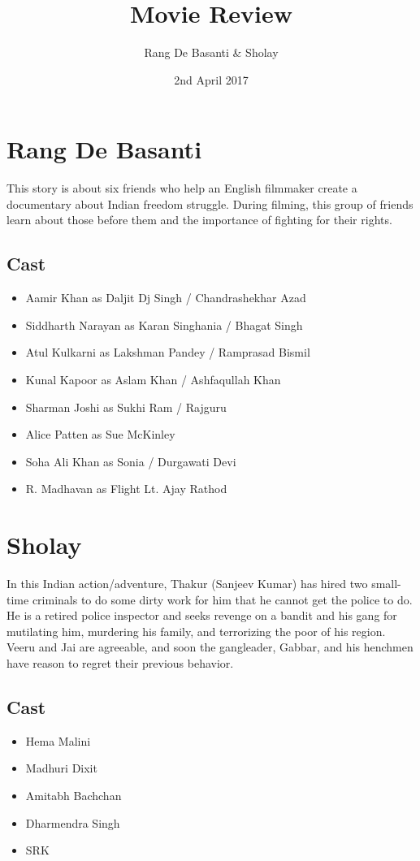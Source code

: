 \documentclass{article}
\title{Movie Review}
\author{Rang De Basanti \& Sholay }
\date{2nd April 2017}
\begin{document}
\maketitle

\section{Rang De Basanti}
This story is about six friends who help an English filmmaker create a documentary about Indian freedom struggle. During filming, this group of friends learn about those before them and the importance of fighting for their rights.
\subsection{Cast}

\begin{itemize}
    \item Aamir Khan as Daljit Dj Singh / Chandrashekhar Azad
    \item Siddharth Narayan as Karan Singhania / Bhagat Singh
    \item Atul Kulkarni as Lakshman Pandey / Ramprasad Bismil
    \item Kunal Kapoor as Aslam Khan / Ashfaqullah Khan
    \item Sharman Joshi as Sukhi Ram / Rajguru
    \item Alice Patten as Sue McKinley
    \item Soha Ali Khan as Sonia / Durgawati Devi
    \item R. Madhavan as Flight Lt. Ajay Rathod
\end{itemize}

\section{Sholay}
In this Indian action/adventure, Thakur (Sanjeev Kumar) has hired two small-time criminals to do some dirty work for him that he cannot get the police to do. He is a retired police inspector and seeks revenge on a bandit and his gang for mutilating him, murdering his family, and terrorizing the poor of his region. Veeru and Jai are agreeable, and soon the gangleader, Gabbar, and his henchmen have reason to regret their previous behavior.
\subsection{Cast}
\begin{itemize}
\item Hema Malini
\item Madhuri Dixit
\item Amitabh Bachchan
\item Dharmendra Singh
\item SRK
  \end{itemize}
\end{document}
